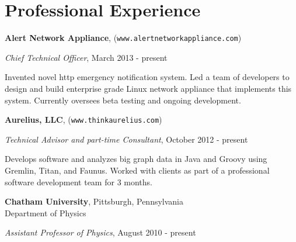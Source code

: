 \section{\sc Professional Experience} %

{\bf Alert Network Appliance}, (\texttt{www.alertnetworkappliance.com})\\
\begin{list1}
\vspace{-4mm}
\item[] {\em  Chief Technical Officer}, March 2013 - present
\item[] Invented novel http emergency notification system.  Led a team of developers to design and build enterprise grade Linux network appliance that implements this system. Currently oversees beta testing and ongoing development.
\end{list1}


{\bf Aurelius, LLC}, (\texttt{www.thinkaurelius.com})\\
\begin{list1}
\vspace{-4mm}
\item[] {\em  Technical Advisor and part-time Consultant}, October 2012 - present
\item[] Develops software and analyzes big graph data in Java and Groovy using Gremlin, Titan, and Faunus. Worked with clients as part of a professional software development team for 3 months.
\end{list1}




{\bf Chatham University}, Pittsburgh, Pennsylvania\\
Department of Physics
\begin{list1}
\item[] {\em  Assistant Professor of Physics}, August 2010 - present
\end{list1}



